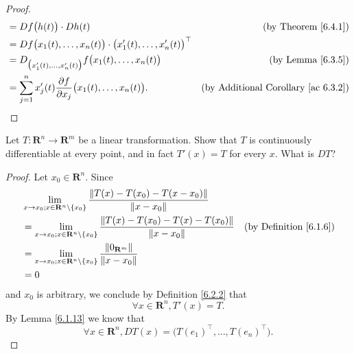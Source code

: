 \begin{proof}
\begin{align*}
                                  & = D f\big(h(t)\big) \cdot D h(t)                                                         & \text{(by Theorem \ref{6.4.1})}                 \\
                                  & = D f\big(x_1(t), \dots, x_n(t)\big) \cdot \big(x_1'(t), \dots, x_n'(t)\big)^\top                                                          \\
                                  & = D_{\big(x_1'(t), \dots, x_n'(t)\big)} f\big(x_1(t), \dots, x_n(t)\big)                 & \text{(by Lemma \ref{6.3.5})}                   \\
                                  & = \sum_{j = 1}^n x_j'(t) \frac{\partial f}{\partial x_j}\big(x_1(t), \dots, x_n(t)\big). & \text{(by Additional Corollary \ref{ac 6.3.2})}
    \end{align*}
\end{proof}

\exercisesection

\begin{exercise}\label{ex 6.4.1}
    Let \(T : \mathbf{R}^n \to \mathbf{R}^m\) be a linear transformation.
    Show that \(T\) is continuously differentiable at every point, and in fact \(T'(x) = T\) for every \(x\).
    What is \(D T\)?
\end{exercise}

\begin{proof}
    Let \(x_0 \in \mathbf{R}^n\).
    Since
    \begin{align*}
         & \lim_{x \to x_0 ; x \in \mathbf{R}^n \setminus \{x_0\}} \frac{\norm*{T(x) - T(x_0) - T(x - x_0)}}{\norm*{x - x_0}}                                           \\
         & = \lim_{x \to x_0 ; x \in \mathbf{R}^n \setminus \{x_0\}} \frac{\norm*{T(x) - T(x_0) - T(x) - T(x_0)}}{\norm*{x - x_0}} & \text{(by Definition \ref{6.1.6})} \\
         & = \lim_{x \to x_0 ; x \in \mathbf{R}^n \setminus \{x_0\}} \frac{\norm*{0_{\mathbf{R}^m}}}{\norm*{x - x_0}}                                                   \\
         & = 0
    \end{align*}
    and \(x_0\) is arbitrary, we conclude by Definition \ref{6.2.2} that
    \[
        \forall x \in \mathbf{R}^n, T'(x) = T.
    \]
    By Lemma \ref{6.1.13} we know that
    \[
        \forall x \in \mathbf{R}^n, D T(x) = \big(T(e_1)^\top, \dots, T(e_n)^\top\big).
    \]
\end{proof}

